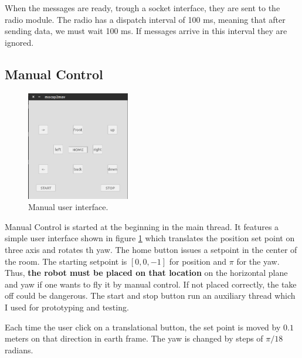 When the messages are ready, trough a socket interface, they are sent to the radio module. The radio has a dispatch interval of 100 ms, meaning that after sending data, we must wait 100 ms. If messages arrive in this interval they are ignored. 

\subsection{Manual Control}

\begin{figure}[h]
\centering
 \includegraphics[width=0.4\textwidth]{mangui.png}
 \caption{Manual user interface.}
 \label{figure:mangui}
\end{figure}

Manual Control is started at the beginning in the main thread. It features a simple user interface shown in figure \ref{figure:mangui} which translates the position set point on three axis and rotates th yaw. The home button issues a setpoint in the center of the room. The starting setpoint is $[0,0,-1]$ for position and $\pi$ for the yaw. Thus, \textbf{the robot must be placed on that location} on the horizontal plane and yaw if one wants to fly it by manual control. If not placed correctly, the take off could be dangerous. The start and stop button run an auxiliary thread which I used for prototyping and testing. 

Each time the user click on a translational button, the set point is moved by $0.1$ meters on that direction in earth frame. The yaw is changed by steps of $\pi/18$ radians.


